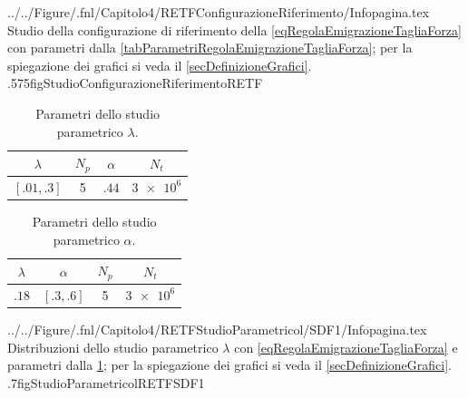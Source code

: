                 {../../Figure/.fnl/Capitolo4/RETFConfigurazioneRiferimento/Infopagina.tex}
                {Studio della configurazione di riferimento della \ref{eqRegolaEmigrazioneTagliaForza} con parametri dalla \cref{tabParametriRegolaEmigrazioneTagliaForza}; per la spiegazione dei grafici si veda il \cref{secDefinizioneGrafici}.}
                {.575\linewidth}{figStudioConfigurazioneRiferimentoRETF}

            \begin{table}[htb]
                \centering
                \begin{tabular}{cccc}
                    \hline
                    \(\lambda\)&\(N_p\)&\(\alpha\)&\(N_t\)\\
                    \hline
                    \([\num{.01},\num{.3}]\)&5&\(\num{.44}\)&\(\num{3e6}\)\\
                    \hline
                \end{tabular}
                \caption{Parametri dello studio parametrico \(\lambda\).}
                \label{tabStudioParametricolRegolaEmigrazioneTagliaForza}
            \end{table}

            \begin{table}[htb]
                \centering
                \begin{tabular}{cccc}
                    \hline
                    \(\lambda\)&\(\alpha\)&\(N_p\)&\(N_t\)\\
                    \hline
                    \(\num{.18}\)&\([\num{.3},\num{.6}]\)&5&\(\num{3e6}\)\\
                    \hline
                \end{tabular}
                \caption{Parametri dello studio parametrico \(\alpha\).}
                \label{tabStudioParametricoaRegolaEmigrazioneTagliaForza}
            \end{table}

                    {../../Figure/.fnl/Capitolo4/RETFStudioParametricol/SDF1/Infopagina.tex}
                    {Distribuzioni dello studio parametrico \(\lambda\) con \ref{eqRegolaEmigrazioneTagliaForza} e parametri dalla \cref{tabStudioParametricolRegolaEmigrazioneTagliaForza}; per la spiegazione dei grafici si veda il \cref{secDefinizioneGrafici}.}
                    {.7\linewidth}{figStudioParametricolRETFSDF1}

